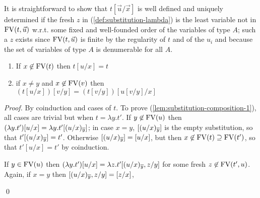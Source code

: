 It is straightforward to show that $t[\vec{u}/{\vec{x}}]$ is well defined and uniquely determined if the
fresh $z$ in (\ref{def:substitution-lambda}) is the least variable not in ${{\rm FV}}(t,\vec{u})$ w.r.t. some fixed and
well-founded order of the variables of type $A$; such a $z$ exists since ${{\rm FV}}(t,\vec{u})$ is finite by the regularity of $t$ and of the $u_i$ and
because the set of variables of type $A$ is denumerable for all $A$. 



\medskip

\begin{lemma}\label{lem:substitution-composition} 
\hfill
\begin{enumerate}
\item \label{lem:substitution-composition-1}
	If $x \not \in {{\rm FV}}(t)$ then $t[u/x] = t$
\item \label{lem:substitution-composition-2}
	if $x\neq y$ and $x \not \in {{\rm FV}}(v)$ then \\
	$(t[u/x])[v/y] = (t[v/y])[u[v/y]/x]$ 
\end{enumerate}
\end{lemma}

\begin{proof} By coinduction and cases of $t$. To prove (\ref{lem:substitution-composition-1}), 
all cases are trivial but when $t = \lambda y.t'$. 
If $y \not\in {{\rm FV}}(u)$ then $(\lambda y.t')[u/x] = \lambda y. t'[(u/x)_{\overline{y}}]$;
in case $x = y$, $[(u/x)_{\overline{y}}]$ is the empty substitution, so that 
$t'[(u/x)_{\overline{y}}] = t'$. Otherwise $[(u/x)_{\overline{y}}]  = [u/x]$, but
then $x \not \in {{\rm FV}}(t) \supseteq {{\rm FV}}(t')$, so that $t'[u/x] = t'$ by coinduction.

If $y \in {{\rm FV}}(u)$ then $(\lambda y.t')[u/x] = \lambda z. t' [(u/x)_{\overline{y}}, z/y]$ for
some fresh $z \not \in {{\rm FV}}(t', u)$. Again, if $x = y$ then $[(u/x)_{\overline{y}}, z/y] = [z/x]$,


%

  
 \qed
\end{proof}